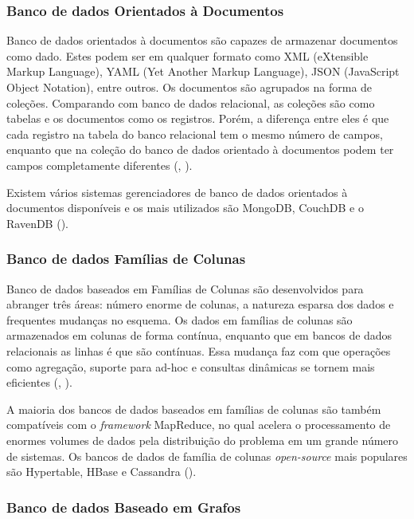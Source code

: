 \subsubsection{Banco de dados Orientados à Documentos}

Banco de dados orientados à documentos são capazes de armazenar documentos como dado. Estes podem ser em qualquer formato como XML (eXtensible Markup Language), YAML (Yet Another Markup Language), JSON (JavaScript Object Notation), entre outros. Os documentos são agrupados na forma de coleções. Comparando com banco de dados relacional, as coleções são como tabelas e os documentos como os registros. Porém, a diferença entre eles é que cada registro na tabela do banco relacional tem o mesmo número de campos, enquanto que na coleção do banco de dados orientado à documentos podem ter campos completamente diferentes (\cite{kaur:2013}, \cite{fowler:2013}).

Existem vários sistemas gerenciadores de banco de dados orientados à documentos disponíveis e os mais utilizados são MongoDB, CouchDB e o RavenDB (\cite{kaur:2013}).

\subsubsection{Banco de dados Famílias de Colunas}

Banco de dados baseados em Famílias de Colunas são desenvolvidos para abranger três áreas: número enorme de colunas, a natureza esparsa dos dados e frequentes mudanças no esquema. Os dados em famílias de colunas são armazenados em colunas de forma contínua, enquanto que em bancos de dados relacionais as linhas é que são contínuas. Essa mudança faz com que operações como agregação, suporte para ad-hoc e consultas dinâmicas se tornem mais eficientes (\cite{kaur:2013}, \cite{fowler:2013}).

A maioria dos bancos de dados baseados em famílias de colunas são também compatíveis com o \textit{framework} MapReduce, no qual acelera o processamento de enormes volumes de dados pela distribuição do problema em um grande número de sistemas. Os bancos de dados de família de colunas \textit{open-source} mais populares são Hypertable, HBase e Cassandra (\cite{kaur:2013}).

\subsubsection{Banco de dados Baseado em Grafos}

